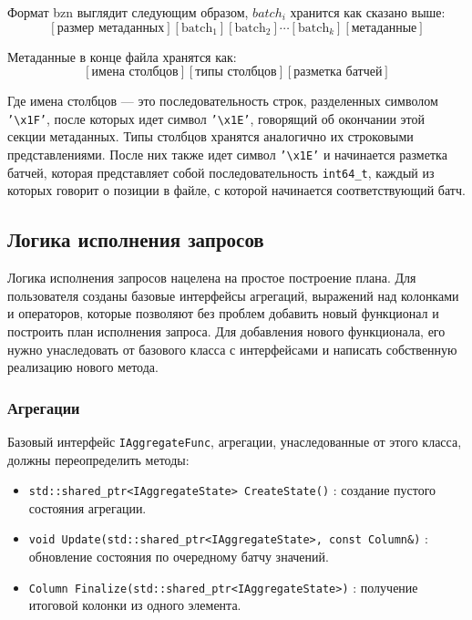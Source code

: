 \documentclass[a4paper,12pt]{extarticle}
\begin{document}
Формат bzn выглядит следующим образом, $batch_i$ хранится как сказано выше:
\begin{equation}
    \left[ \text{размер метаданных} \right] 
     \left[ \text{batch}_1 \right] 
     \left[ \text{batch}_2 \right] 
    \cdots 
    \left[ \text{batch}_k \right] 
    \left[ \text{метаданные} \right]
\end{equation}

Метаданные в конце файла хранятся как:
\begin{equation}
    \left[ \text{имена столбцов} \right] 
    \left[ \text{типы столбцов} \right] 
    \left[ \text{разметка батчей} \right]
\end{equation}

Где имена столбцов — это последовательность строк, разделенных символом
\texttt{'\textbackslash x1F'}, после которых идет символ \texttt{'\textbackslash x1E'},
говорящий об окончании этой секции метаданных. Типы столбцов хранятся аналогично их
строковыми представлениями. После них также идет символ \texttt{'\textbackslash x1E'}
и начинается разметка батчей, которая представляет собой последовательность
\texttt{int64\_t}, каждый из которых говорит о позиции в файле, с которой начинается
соответствующий батч.


\subsection{Логика исполнения запросов}
Логика исполнения запросов нацелена на простое построение плана.
Для пользователя созданы
базовые интерфейсы агрегаций, выражений над колонками и операторов,
которые позволяют без проблем добавить новый функционал и построить план
исполнения запроса.
Для добавления нового функционала, его нужно унаследовать от базового класса 
с интерфейсами и написать собственную реализацию нового метода.

\subsubsection{Агрегации}
Базовый интерфейс \texttt{IAggregateFunc}, агрегации, унаследованные от этого класса,
должны переопределить методы:

\begin{itemize}
    \item \texttt{std::shared\_ptr<IAggregateState> CreateState()} : создание пустого
    состояния агрегации.
    \item \texttt{void Update(std::shared\_ptr<IAggregateState>, const Column\&)} :
    обновление состояния по очередному батчу значений.
    \item \texttt{Column Finalize(std::shared\_ptr<IAggregateState>)} : получение итоговой
    колонки из одного элемента.
\end{itemize}
\end{document}

